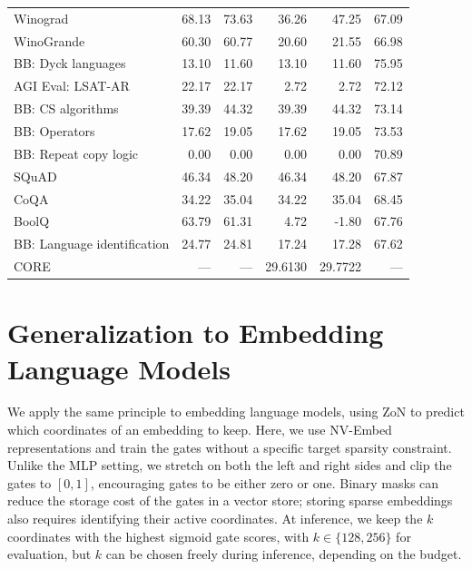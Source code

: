 \begin{table}[!htbp]
\begin{center}
{\begin{tabular}{lrrrrr}
Winograd & 68.13 & 73.63 & 36.26 & 47.25 & 67.09 \\
WinoGrande & 60.30 & 60.77 & 20.60 & 21.55 & 66.98 \\
BB: Dyck languages & 13.10 & 11.60 & 13.10 & 11.60 & 75.95 \\
AGI Eval: LSAT-AR & 22.17 & 22.17 & 2.72 & 2.72 & 72.12 \\
BB: CS algorithms & 39.39 & 44.32 & 39.39 & 44.32 & 73.14 \\
BB: Operators & 17.62 & 19.05 & 17.62 & 19.05 & 73.53 \\
BB: Repeat copy logic & 0.00 & 0.00 & 0.00 & 0.00 & 70.89 \\
SQuAD & 46.34 & 48.20 & 46.34 & 48.20 & 67.87 \\
CoQA & 34.22 & 35.04 & 34.22 & 35.04 & 68.45 \\
BoolQ & 63.79 & 61.31 & 4.72 & -1.80 & 67.76 \\
BB: Language identification & 24.77 & 24.81 & 17.24 & 17.28 & 67.62 \\
\midrule
CORE & --- & --- & 29.6130 & 29.7722 & --- \\
\bottomrule
\end{tabular}}
\end{center}
\end{table}


\section{Generalization to Embedding Language Models}
\label{sec:zon-embedding_models}

We apply the same principle to embedding language models, using ZoN to predict
which coordinates of an embedding to keep. Here, we use NV-Embed representations
and train the gates without a specific target sparsity constraint. Unlike the MLP setting, we
stretch on both the left and right sides and clip the gates to $[0,1]$, encouraging
gates to be either zero or one. Binary masks can reduce the storage cost of the gates in a vector store; storing sparse embeddings also requires identifying their active coordinates. At inference, we keep the $k$ coordinates with
the highest sigmoid gate scores, with $k\in\{128,256\}$ for evaluation,
but $k$ can be chosen freely during inference, depending on the budget.

